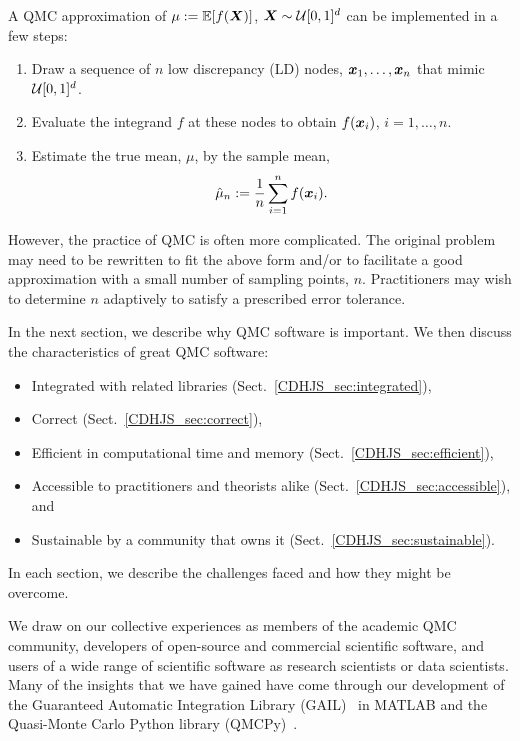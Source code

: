 \documentclass[graybox]{svmult}
\begin{document}
A QMC approximation of $\mu := {\mathbb{E}}[f({\boldsymbol{X}})]$, ${\boldsymbol{X}} \sim {\mathcal{U}}[0,1]^d$ can be implemented in a few steps:
\begin{enumerate}
    \item Draw a sequence of $n$ low discrepancy (LD) \cite{Nie92, SloJoe94, DicEtal14a, DicEtal22a} nodes,
    ${\boldsymbol{x}}_1,\dots,{\boldsymbol{x}}_n$ that mimic ${\mathcal{U}}[0,1]^d$.
    \item Evaluate the integrand $f$ at these nodes to obtain $f({\boldsymbol{x}}_i)$, $i=1,\dots,n$.
    \item Estimate the true mean, $\mu$, by the sample mean,
    \begin{equation*}
        \hat{\mu}_n := \frac{1}{n} \sum_{i=1}^n f({\boldsymbol{x}}_i).
    \end{equation*}
\end{enumerate}

However, the practice of QMC is often more complicated.  The original problem may need to be rewritten to fit the above form and/or to facilitate a good approximation with a small number of sampling points, $n$.  Practitioners may wish to determine $n$ adaptively to satisfy a prescribed error tolerance.

In the next section, we describe why QMC software is important.  We then discuss the characteristics of great QMC software:

\begin{itemize}
\item Integrated with related libraries (Sect.\ \ref{CDHJS_sec:integrated}),

\item Correct (Sect.\ \ref{CDHJS_sec:correct}),

\item Efficient in computational time and memory (Sect.\ \ref{CDHJS_sec:efficient}),

\item Accessible to practitioners and theorists alike (Sect.\ \ref{CDHJS_sec:accessible}), and

\item Sustainable by a community that owns it (Sect.\ \ref{CDHJS_sec:sustainable}).

\end{itemize}
In each section, we describe the challenges faced and how they might be overcome.

We draw on our collective experiences as
members of the academic QMC community, developers of open-source and commercial scientific software, and users of a wide range of scientific software as research scientists or data scientists. Many of the insights that we have gained have come through our development of the Guaranteed Automatic Integration Library (GAIL)~\cite{TonEtAl22a} in MATLAB and the Quasi-Monte Carlo Python library (QMCPy)~\cite{QMCPy2020a}.
\end{document}
